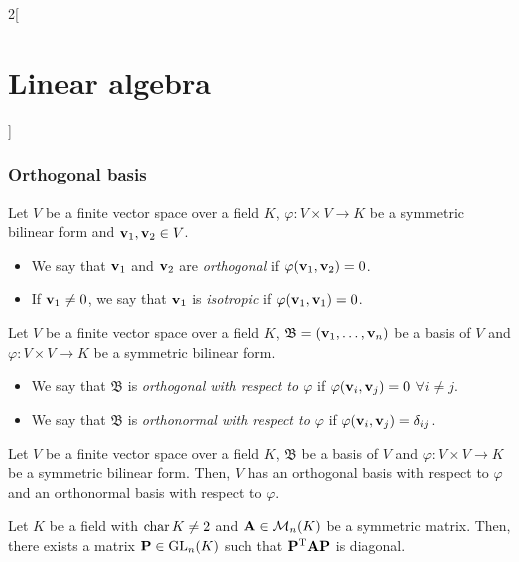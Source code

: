\documentclass[../../../main.tex]{subfiles}
\begin{document}
\begin{multicols}{2}[\section{Linear algebra}]
  \subsubsection{Orthogonal basis}
  \begin{definition}\label{ALG-isotrop}
    Let $V$ be a finite vector space over a field $K$, $\varphi:V\times V\rightarrow K$ be a symmetric bilinear form and $\boldsymbol{\mathrm{v}}_1,\boldsymbol{\mathrm{v}}_2\in V$.
    \begin{itemize}
      \item We say that $\boldsymbol{\mathrm{v}}_1$ and $\boldsymbol{\mathrm{v}}_2$ are \textit{orthogonal} if $\varphi(\boldsymbol{\mathrm{v}}_1,\boldsymbol{\mathrm{v}}_2)=0$.
      \item If $\boldsymbol{\mathrm{v}}_1\ne 0$, we say that $\boldsymbol{\mathrm{v}}_1$ is \textit{isotropic} if $\varphi(\boldsymbol{\mathrm{v}}_1,\boldsymbol{\mathrm{v}}_1)=0$.
    \end{itemize}
  \end{definition}
  \begin{definition}
    Let $V$ be a finite vector space over a field $K$, $\mathfrak{B}=(\boldsymbol{\mathrm{v}}_1,\ldots,\boldsymbol{\mathrm{v}}_n)$ be a basis of $V$ and $\varphi:V\times V\rightarrow K$ be a symmetric bilinear form.
    \begin{itemize}
      \item We say that $\mathfrak{B}$ is \textit{orthogonal with respect to $\varphi$} if $\varphi(\boldsymbol{\mathrm{v}}_i,\boldsymbol{\mathrm{v}}_j)=0$ $\forall i\ne j$.
      \item We say that $\mathfrak{B}$ is \textit{orthonormal with respect to $\varphi$} if $\varphi(\boldsymbol{\mathrm{v}}_i,\boldsymbol{\mathrm{v}}_j)=\delta_{ij}$.
    \end{itemize}
  \end{definition}
  \begin{theorem}
    Let $V$ be a finite vector space over a field $K$, $\mathfrak{B}$ be a basis of $V$ and $\varphi:V\times V\rightarrow K$ be a symmetric bilinear form. Then, $V$ has an orthogonal basis with respect to $\varphi$ and an orthonormal basis with respect to $\varphi$.
  \end{theorem}
  \begin{corollary}
    Let $K$ be a field with $\operatorname{char} K\ne 2$ and $\boldsymbol{\mathrm{A}}\in\mathcal{M}_n(K)$ be a symmetric matrix. Then, there exists a matrix $\boldsymbol{\mathrm{P}}\in\mathrm{GL}_n(K)$ such that $\vb{P}^{\mathrm{T}}\boldsymbol{\mathrm{A}}\boldsymbol{\mathrm{P}}$ is diagonal.
  \end{corollary}

\end{multicols}
\end{document}
